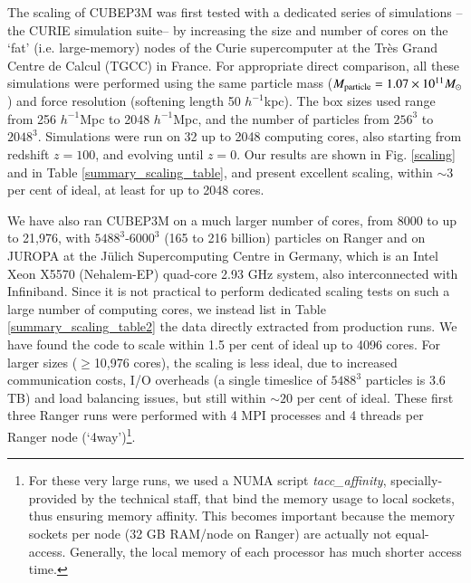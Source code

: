 \documentclass[useAMS,usenatbib]{mn2e}
\begin{document}
 
The scaling of {\small CUBEP3M}  was first  tested with a dedicated series 
of simulations -- the CURIE simulation suite-- by increasing the size and number of cores on the `fat' 
(i.e. large-memory) nodes of the  Curie supercomputer at the Tr\`{e}s Grand Centre de Calcul (TGCC) in France. 
 For appropriate direct comparison,
all these simulations were performed using the same particle mass 
($M_{\rm particle}=1.07\times10^{11}M_\odot$) and force resolution 
(softening length 50 $h^{-1}$kpc). The box sizes used range from 256 $h^{-1}$Mpc
to 2048 $h^{-1}$Mpc, and the number of particles from $256^3$ to $2048^3$.
Simulations were run on 32 up to 2048 computing cores, also starting from 
redshift $z=100$, and evolving until $z=0$. Our results are shown in Fig. \ref{scaling} and in Table \ref{summary_scaling_table}, and present excellent scaling, within 
$\sim3$ per cent of ideal, at least for up to 2048 cores. 



We have also ran {\small CUBEP3M} on a much larger number of cores, 
from 8000 to up to 21,976, with $5488^3$-$6000^3$ (165 to 216 billion) 
particles on Ranger and on JUROPA at the J\"ulich Supercomputing Centre in Germany, 
which is an Intel Xeon X5570 
(Nehalem-EP) quad-core 2.93 GHz system, also interconnected with Infiniband.
Since it is not practical to perform dedicated scaling tests on such a large number of
computing cores, we instead list in Table \ref{summary_scaling_table2} 
the data directly extracted from production runs. We have found the 
code to scale within 1.5 per cent of ideal up to 4096 cores. 
For larger sizes ($\ge$10,976 cores), the scaling is less ideal,
due to increased communication 
costs, I/O overheads (a single timeslice of $5488^3$ particles is 3.6 TB)
and load balancing issues, but still within $\sim20$ per cent of ideal. 
These first three Ranger runs were performed 
with 4 {\small MPI} processes and 4 threads per Ranger node (`4way')\footnote{For these very large runs, 
we used a NUMA script {\it tacc\_affinity}, specially-provided by the technical staff, 
that bind the memory usage to local sockets, thus ensuring memory affinity. 
This becomes important because the memory sockets per node 
(32 GB RAM/node on Ranger) are actually not equal-access. Generally, the local 
memory of each processor has much shorter access time.}.
\end{document}
